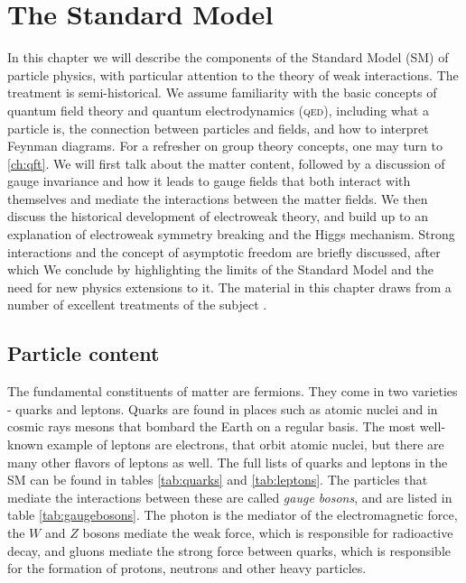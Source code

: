 \chapter{The Standard Model}\label{ch:sm}

\newcommand{\ct}{\cos\theta_w}
\newcommand{\st}{\sin\theta_w}

In this chapter we will describe the components of the Standard Model (SM) of particle physics, with particular attention to the theory of weak interactions. The treatment is semi-historical. We assume familiarity with the basic concepts of quantum field theory and quantum electrodynamics (\textsc{qed}), including what a particle is, the connection between particles and fields, and how to interpret Feynman diagrams. For a refresher on group theory concepts, one may turn to \autoref{ch:qft}. We will first talk about the matter content, followed by a discussion of gauge invariance and how it leads to gauge fields that both interact with themselves and mediate the interactions between the matter fields. We then discuss the historical development of electroweak theory, and build up to an explanation of electroweak symmetry breaking and the Higgs mechanism. Strong interactions and the concept of asymptotic freedom are briefly discussed, after which We conclude by highlighting the limits of the Standard Model and the need for new physics extensions to it. The material in this chapter draws from a number of excellent treatments of the subject \citep{Cheng1985,Schwartz2014,Zee2010,Peskin:1995ev}.

\section{Particle content}

The fundamental constituents of matter are fermions. They come in two varieties - quarks and leptons. Quarks are found in places such as atomic nuclei and in cosmic rays mesons that bombard the Earth on a regular basis. The most well-known example of leptons are electrons, that orbit atomic nuclei, but there are many other flavors of leptons as well. The full lists of quarks and leptons in the SM can be found in tables \ref{tab:quarks} and \ref{tab:leptons}. The particles that mediate the interactions between these are called \emph{gauge bosons}, and are listed in table \ref{tab:gaugebosons}. The photon is the mediator of the electromagnetic force, the $W$ and $Z$ bosons mediate the weak force, which is responsible for radioactive decay, and gluons mediate the strong force between quarks, which is responsible for the formation of protons, neutrons and other heavy particles.

